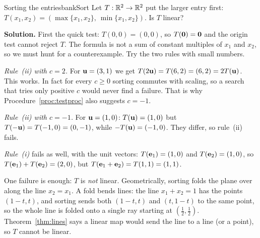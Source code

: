 \documentclass[11pt]{article}
\begin{document}
\begin{exmp}{Sorting the entries}{bankSort}
Let $T:\mathbb{R}^2\to\mathbb{R}^2$ put the larger entry first: $T(x_1,x_2)=(\max\{x_1,x_2\},\ \min\{x_1,x_2\})$. Is $T$ linear?

\textbf{Solution.} First the quick test: $T(0,0)=(0,0)$, so $T(\mathbf{0})=\mathbf{0}$ and the origin test cannot reject $T$. The formula is not a sum of constant multiples of $x_1$ and $x_2$, so we must hunt for a counterexample. Try the two rules with small numbers.

\emph{Rule~(ii) with $c=2$.} For $\mathbf{u}=(3,1)$ we get $T(2\mathbf{u})=T(6,2)=(6,2)=2T(\mathbf{u})$. This works. In fact for every $c\ge0$ sorting commutes with scaling, so a search that tries only positive $c$ would never find a failure. That is why Procedure~\ref{proc:testproc} also suggests $c=-1$.

\emph{Rule~(ii) with $c=-1$.} For $\mathbf{u}=(1,0)$: $T(\mathbf{u})=(1,0)$ but $T(-\mathbf{u})=T(-1,0)=(0,-1)$, while $-T(\mathbf{u})=(-1,0)$. They differ, so rule~(ii) fails.

\emph{Rule~(i)} fails as well, with the unit vectors: $T(\mathbf{e}_1)=(1,0)$ and $T(\mathbf{e}_2)=(1,0)$, so $T(\mathbf{e}_1)+T(\mathbf{e}_2)=(2,0)$, but $T(\mathbf{e}_1+\mathbf{e}_2)=T(1,1)=(1,1)$.

One failure is enough: $T$ is \emph{not} linear. Geometrically, sorting folds the plane over along the line $x_2=x_1$. A fold bends lines: the line $x_1+x_2=1$ has the points $(1-t,t)$, and sorting sends both $(1-t,t)$ and $(t,1-t)$ to the same point, so the whole line is folded onto a single ray starting at $(\tfrac12,\tfrac12)$. Theorem~\ref{thm:lines} says a linear map would send the line to a line (or a point), so $T$ cannot be linear.
\end{exmp}
\end{document}
